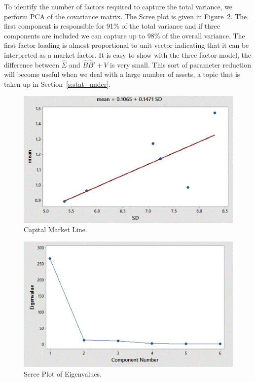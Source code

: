 To identify the number of factors required to capture the total variance, we perform PCA of the covariance matrix. The Scree plot is given in Figure~\ref{fig:screeplot}. The first component is responsible for 91\% of the total variance and if three components are included we can capture up to 98\% of the overall variance. The first factor loading is almost proportional to unit vector indicating that it can be interpreted as a market factor. It is easy to show with the three factor model, the difference between $\hat{\Sigma}$ and $\hat{B}\hat{B}'+V$ is very small. This sort of parameter reduction will become useful when we deal with a large number of assets, a topic that is taken up in Section~\ref{s:stat_under}.

        \begin{figure}[H]
        \centering
        \includegraphics[width=\textwidth]{chapters/chapter_apm/figures/capmarket.png} 
        \caption{Capital Market Line.\label{fig:capmarket}}
        \end{figure}


        \begin{figure}[H]
        \centering
        \includegraphics[width=\textwidth]{chapters/chapter_apm/figures/scree.png} 
        \caption{Scree Plot of Eigenvalues.\label{fig:screeplot}}
        \end{figure}
       
